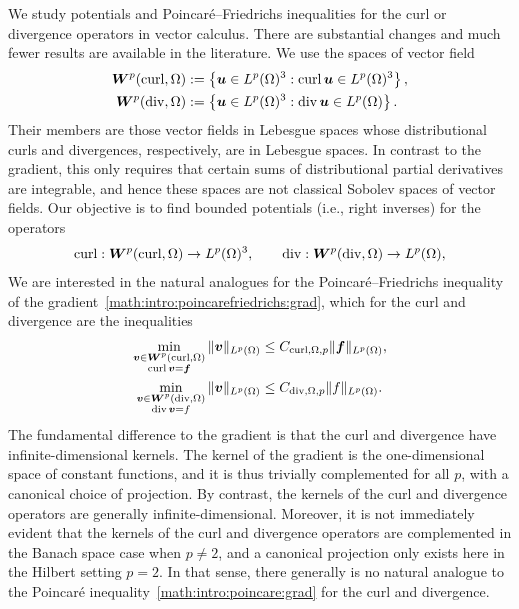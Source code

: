 \documentclass[10pt,a4paper]{article}
\begin{document}
We study potentials and Poincar\'e--Friedrichs inequalities for the curl or divergence operators in vector calculus.
There are substantial changes and much fewer results are available in the literature. 
We use the spaces of vector field 
\begin{align}
    \bm{W}^{p}(\operatorname{curl},\Omega) &:= \left\{ \bm{u} \in L^{p}(\Omega)^{3} : \operatorname{curl} \bm{u} \in L^{p}(\Omega)^{3} \right\}
    \label{math:intro:Wcurl}
    ,
    \\
    \bm{W}^{p}(\operatorname{div},\Omega) &:= \left\{ \bm{u} \in L^{p}(\Omega)^{3} : \operatorname{div} \bm{u} \in L^{p}(\Omega) \right\}
    \label{math:intro:Wdiv}
    .
\end{align}
Their members are those vector fields in Lebesgue spaces whose distributional curls and divergences, respectively, are in Lebesgue spaces. 
In contrast to the gradient, this only requires that certain sums of distributional partial derivatives are integrable, 
and hence these spaces are not classical Sobolev spaces of vector fields. 
Our objective is to find bounded potentials (i.e., right inverses) for the operators 
\begin{align*}
    \operatorname{curl} : \bm{W}^{p}(\operatorname{curl},\Omega) \rightarrow L^{p}(\Omega)^{3},
    \qquad 
    \operatorname{div} : \bm{W}^{p}(\operatorname{div},\Omega) \rightarrow L^{p}(\Omega),
\end{align*}
We are interested in the natural analogues for the Poincar\'e--Friedrichs inequality of the gradient~\eqref{math:intro:poincarefriedrichs:grad},
which for the curl and divergence are the inequalities 
\begin{align}
    \min\limits_{ \substack{ \bfv \in \bfW^{p}(\curl,\Omega) \\ \curl \bfv = \bff } } 
    \| \bfv \|_{L^{p}(\Omega)}
    &\leq 
    C_{\curl,\Omega,p}
    \| \bff \|_{L^{p}(\Omega)}
    \label{math:intro:Wcurl:pf}
    ,
    \\%
    \min\limits_{ \substack{ \bfv \in \bfW^{p}(\divergence,\Omega) \\ \divergence \bfv = f } } 
    \| \bfv \|_{L^{p}(\Omega)}
    &\leq 
    C_{\divergence,\Omega,p}
    \| f \|_{L^{p}(\Omega)}
    \label{math:intro:Wdiv:pf}
    .
\end{align}
The fundamental difference to the gradient is that the curl and divergence have infinite-dimensional kernels. 
The kernel of the gradient is the one-dimensional space of constant functions, and it is thus trivially complemented for all $p$, with a canonical choice of projection. 
By contrast, the kernels of the curl and divergence operators are generally infinite-dimensional. 
Moreover, it is not immediately evident that the kernels of the curl and divergence operators are complemented in the Banach space case when $p \neq 2$, 
and a canonical projection only exists here in the Hilbert setting $p=2$. 
In that sense, there generally is no natural analogue to the Poincar\'e inequality~\eqref{math:intro:poincare:grad} for the curl and divergence. 
\end{document}
